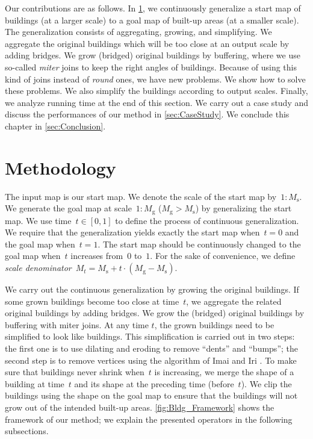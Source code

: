 Our contributions are as follows.
In \sect\ref{sec:Methodology},
we continuously generalize a start map of buildings
(at a larger scale) 
to a goal map of built-up areas (at a smaller scale).
The generalization consists of 
aggregating, growing, and simplifying.
We aggregate the original buildings which will be too close 
at an output scale by adding bridges.
We grow (bridged) original buildings by buffering,
where we use so-called \emph{miter} joins to keep the right 
angles of buildings.
Because of using this kind of joins 
instead of \emph{round} ones,
we have new problems.
We show how to solve these problems.
We also simplify the buildings according to output scales.
Finally, we analyze running time at the end of this section.
We carry out a case study 
and discuss the performances of our method in 
\sect\ref{sec:CaseStudy}.
We conclude this chapter in \sect\ref{sec:Conclusion}.

\section{Methodology}
\label{sec:Methodology}
The input map is our start map.
We denote the scale of the start map by~$1:M_\mathrm{s}$.
We generate the goal map at scale~$1:M_\mathrm{g}$ 
($M_\mathrm{g} > M_\mathrm{s}$) by generalizing the start map. 
We use time~$t\in[0,1]$ to define 
the process of continuous generalization. 
We require that 
the generalization yields exactly the start map when~$t=0$ 
and the goal map when~$t=1$.
The start map should be continuously changed to the goal map 
when~$t$ increases from~$0$ to~$1$.
For the sake of convenience, we define 
\emph{scale denominator}~$M_t= 
M_\mathrm{s} + t \cdot (M_\mathrm{g}-M_\mathrm{s})$.

We carry out the continuous generalization 
by growing the original buildings. 
If some grown buildings become too close at time~$t$,
we aggregate the related original buildings by adding bridges.
We grow the (bridged) original buildings 
by buffering with miter joins.
At any time $t$, the grown buildings 
need to be simplified to look like buildings.
This simplification is carried out in two steps:
the first one is to use dilating and eroding 
to remove ``dents'' and ``bumps''; 
the second step is to remove vertices 
using the algorithm of Imai and Iri \citep{ImaiIri1988}.
To make sure that buildings never shrink 
when~$t$ is increasing,
we merge the shape of a building at time~$t$ 
and its shape at the preceding time (before~$t$). 
We clip the buildings using the shape on the goal map to 
ensure that the buildings will not 
grow out of the intended built-up areas.
\fig\ref{fig:Bldg_Framework} shows 
the framework of our method;
we explain the presented operators
in the following subsections.




